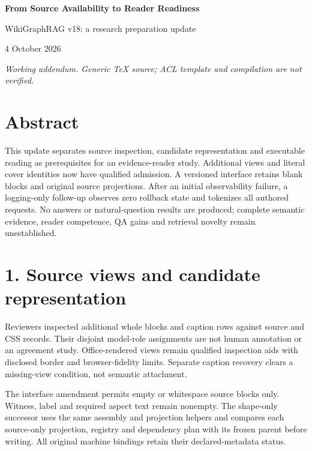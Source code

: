 \documentclass[10pt,a4paper]{article}
\begin{document}
\begin{center}{\Large\bfseries From Source Availability to Reader Readiness}\par
WikiGraphRAG v18: a research preparation update\par
4 October 2026\end{center}
\textit{Working addendum. Generic TeX source; ACL template and compilation are not verified.}
\section*{Abstract}
This update separates source inspection, candidate representation and executable reading as prerequisites for an evidence-reader study. Additional views and literal cover identities now have qualified admission. A versioned interface retains blank blocks and original source projections. After an initial observability failure, a logging-only follow-up observes zero rollback state and tokenizes all authored requests. No answers or natural-question results are produced; complete semantic evidence, reader competence, QA gains and retrieval novelty remain unestablished.
\section*{1. Source views and candidate representation}
Reviewers inspected additional whole blocks and caption rows against source and CSS records. Their disjoint model-role assignments are not human annotation or an agreement study. Office-rendered views remain qualified inspection aids with disclosed border and browser-fidelity limits. Separate caption recovery clears a missing-view condition, not semantic attachment.

The interface amendment permits empty or whitespace source blocks only. Witness, label and required aspect text remain nonempty. The shape-only successor uses the same assembly and projection helpers and compares each source-only projection, registry and dependency plan with its frozen parent before writing. All original machine bindings retain their declared-metadata status.
\end{document}
